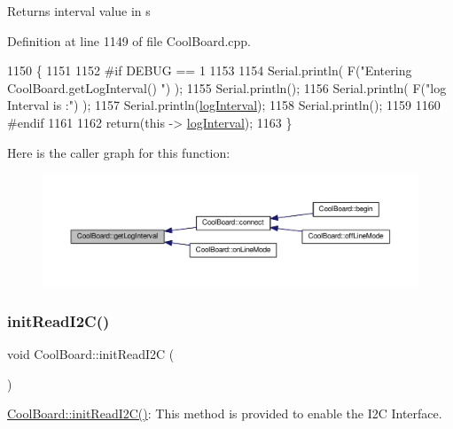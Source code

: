 \begin{DoxyReturn}{Returns}
interval value in s 
\end{DoxyReturn}


Definition at line 1149 of file Cool\+Board.\+cpp.


\begin{DoxyCode}
1150 \{
1151 
1152 \textcolor{preprocessor}{#if DEBUG == 1}
1153 
1154     Serial.println( F(\textcolor{stringliteral}{"Entering CoolBoard.getLogInterval() "}) );
1155     Serial.println();
1156     Serial.println( F(\textcolor{stringliteral}{"log Interval is :"}) );
1157     Serial.println(\hyperlink{class_cool_board_a84bc94413b64973e4aba8c467c97006c}{logInterval});
1158     Serial.println();
1159 
1160 \textcolor{preprocessor}{#endif}
1161 
1162     \textcolor{keywordflow}{return}(\textcolor{keyword}{this} -> \hyperlink{class_cool_board_a84bc94413b64973e4aba8c467c97006c}{logInterval});
1163 \}
\end{DoxyCode}
Here is the caller graph for this function\+:\nopagebreak
\begin{figure}[H]
\begin{center}
\leavevmode
\includegraphics[width=350pt]{d7/df9/class_cool_board_a7508e029f2ee17bb747ffab599285e0d_icgraph}
\end{center}
\end{figure}
\mbox{\label{class_cool_board_a397b46fadab8f530a8cf4d914c561366}} 
\subsubsection{\texorpdfstring{init\+Read\+I2\+C()}{initReadI2C()}}
{\footnotesize\ttfamily void Cool\+Board\+::init\+Read\+I2C (\begin{DoxyParamCaption}{ }\end{DoxyParamCaption})}

\hyperlink{class_cool_board_a397b46fadab8f530a8cf4d914c561366}{Cool\+Board\+::init\+Read\+I2\+C()}\+: This method is provided to enable the I2C Interface. 


